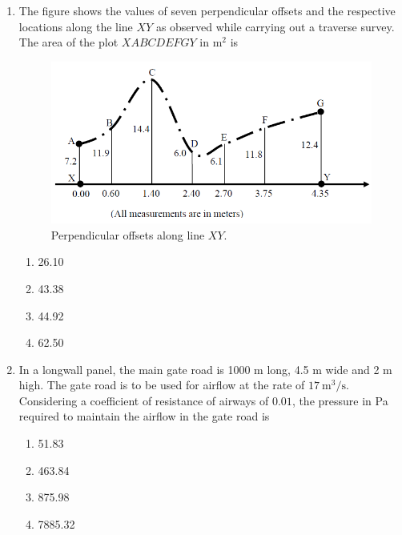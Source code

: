 \documentclass[journal]{IEEEtran}
\begin{document}
\begin{enumerate}[leftmargin=0pt]
\item The figure shows the values of seven perpendicular offsets and the respective locations along the line $XY$ as observed while carrying out a traverse survey. The area of the plot $XABCDEFGY$ in m$^2$ is
\begin{figure}[H]
\centering
\includegraphics[width=0.7\linewidth]{figs/offsets.png}
\caption{Perpendicular offsets along line $XY$.}
\end{figure}
\begin{multicols}{2}
\begin{enumerate}[label=(\Alph*),itemsep=0pt,topsep=2pt]
  \item 26.10
  \item 43.38
  \item 44.92
  \item 62.50
\end{enumerate}
\end{multicols}
\hfill{}

\item In a longwall panel, the main gate road is 1000 m long, 4.5 m wide and 2 m high. The gate road is to be used for airflow at the rate of $17~\text{m}^3/\text{s}$. Considering a coefficient of resistance of airways of $0.01$, the pressure in Pa required to maintain the airflow in the gate road is
\begin{multicols}{2}
\begin{enumerate}[label=(\Alph*),itemsep=0pt,topsep=2pt]
  \item 51.83
  \item 463.84
  \item 875.98
  \item 7885.32
\end{enumerate}
\end{multicols}
\hfill{}


\end{enumerate}
\end{document}
